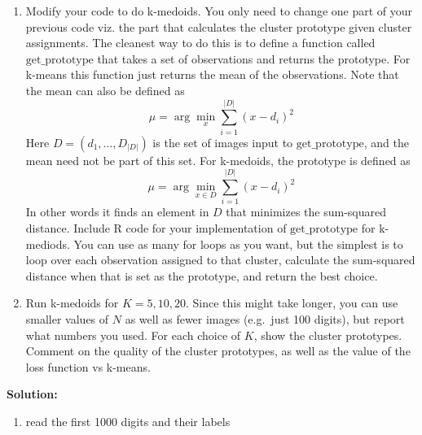 \documentclass[]{article}
\providecommand{\tightlist}{%
  \setlength{\itemsep}{0pt}\setlength{\parskip}{0pt}}
\begin{document}
\begin{enumerate}
\def\labelenumi{\arabic{enumi}.}
\setcounter{enumi}{6}
\item
  Modify your code to do k-medoids. You only need to change one part of
  your previous code viz. the part that calculates the cluster prototype
  given cluster assignments. The cleanest way to do this is to define a
  function called \(\mathrm{get\_prototype}\) that takes a set of
  observations and returns the prototype. For k-means this function just
  returns the mean of the observations. Note that the mean can also be
  defined as \[\mu = \arg \min_x \sum_{i = 1}^{|D|}(x - d_i)^2\] Here
  \(D = (d_1, \dots, D_{|D|})\) is the set of images input to
  \(\mathrm{get\_prototype}\), and the mean need not be part of this
  set. For k-medoids, the prototype is defined as
  \[\mu = \arg \min_{x\in D} \sum_{i = 1}^{|D|}(x - d_i)^2\] In other
  words it finds an element in \(D\) that minimizes the sum-squared
  distance. Include R code for your implementation of
  \(\mathrm{get\_prototype}\) for k-mediods. You can use as many for
  loops as you want, but the simplest is to loop over each observation
  assigned to that cluster, calculate the sum-squared distance when that
  is set as the prototype, and return the best choice.
\item
  Run k-medoids for \(K = 5, 10, 20\). Since this might take longer, you
  can use smaller values of \(N\) as well as fewer images (e.g.~just 100
  digits), but report what numbers you used. For each choice of \(K\),
  show the cluster prototypes. Comment on the quality of the cluster
  prototypes, as well as the value of the loss function vs k-means.
\end{enumerate}

\textbf{Solution:}

\begin{enumerate}
\def\labelenumi{\arabic{enumi}.}
\tightlist
\item
  read the first 1000 digits and their labels
\end{enumerate}
\end{document}
